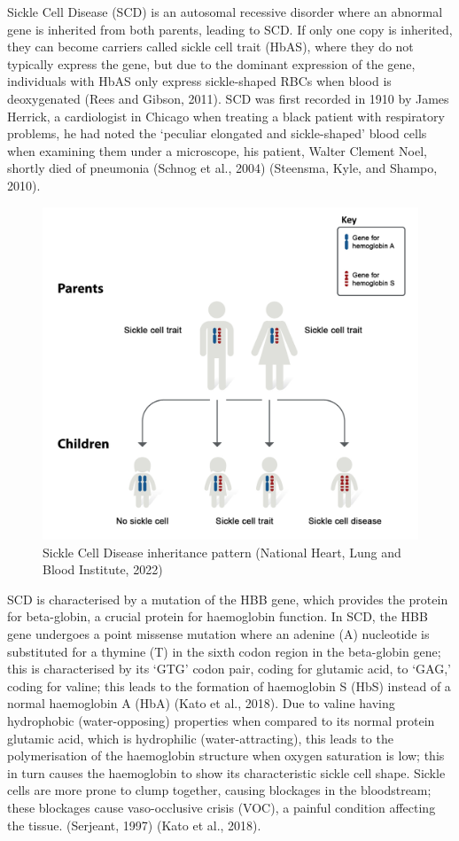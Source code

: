 \documentclass{mva_style}
\begin{document}
Sickle Cell Disease (SCD) is an autosomal recessive disorder where an abnormal gene is inherited from both parents, leading to SCD. If only one copy is inherited, they can become carriers called sickle cell trait (HbAS), where they do not typically express the gene, but due to the dominant expression of the gene, individuals with HbAS only express sickle-shaped RBCs when blood is deoxygenated (Rees and Gibson, 2011).
SCD was first recorded in 1910 by James Herrick, a cardiologist in Chicago when treating a black patient with respiratory problems, he had noted the ‘peculiar elongated
and sickle-shaped’ blood cells when examining them under a microscope, his patient, Walter Clement Noel, shortly died of pneumonia (Schnog et al., 2004) (Steensma, Kyle, and Shampo, 2010).

\begin{figure}
    \centering
    \includegraphics[width=0.5\linewidth]{img/National Heart, Lung and Blood Institute, 2022.png}
    \caption{Sickle Cell Disease inheritance pattern (National Heart, Lung and Blood Institute, 2022)}
    \label{fig:enter-label}
\end{figure}

SCD is characterised by a mutation of the HBB gene, which provides the protein for beta-globin, a crucial protein for haemoglobin function. In SCD, the HBB gene undergoes a point missense mutation where an adenine (A) nucleotide is substituted for a thymine (T) in the sixth codon region in the beta-globin gene; this is characterised by its ‘GTG’ codon pair, coding for glutamic acid, to ‘GAG,’ coding for valine; this leads to the formation of haemoglobin S (HbS) instead of a normal haemoglobin A (HbA) (Kato et al., 2018). Due to valine having hydrophobic (water-opposing) properties when compared to its normal protein glutamic acid, which is hydrophilic (water-attracting), this leads to the polymerisation of the haemoglobin structure when oxygen saturation is low; this in turn causes the haemoglobin to show its characteristic sickle cell shape. Sickle cells are more prone to clump together, causing blockages in the bloodstream; these blockages cause vaso-occlusive crisis (VOC), a painful condition affecting the tissue. (Serjeant, 1997) (Kato et al., 2018). 
\end{document}
